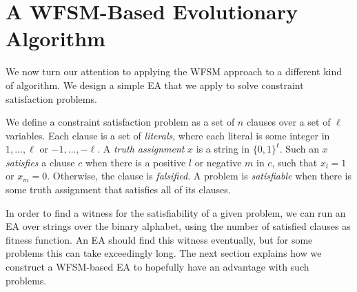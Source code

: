 \documentclass{llncs}
\begin{document}
\section{A WFSM-Based Evolutionary Algorithm}
\label{fartheststring}

We now turn our attention to applying the WFSM approach to a different
kind of algorithm.
We design a simple EA that we apply to solve
constraint satisfaction problems.



We define a constraint satisfaction problem as a set of $n$ clauses
over a set of $\ell$ variables.
Each clause is a set of \emph{literals},
where each literal is some integer in
$1, \ldots, \ell$ or $-1, \ldots, -\ell$.
A \emph{truth assignment} $x$ is a string in $\{0,1\}^\ell$.
Such an $x$ \emph{satisfies} a clause $c$ when there is a positive $l$
or negative $m$ in $c$, such that $x_l=1$ or $x_m=0$.
Otherwise, the clause is \emph{falsified}.
A problem is \emph{satisfiable} when there is some truth assignment that
satisfies all of its clauses.

In order to find a witness for the satisfiability of a given problem,
we can run an EA over strings over the binary alphabet,
using the number of satisfied clauses as fitness function.
An EA should find this witness eventually,
but for some problems this can take exceedingly long.
The next section explains how we construct a WFSM-based EA
to hopefully have an advantage with such problems.

\end{document}
